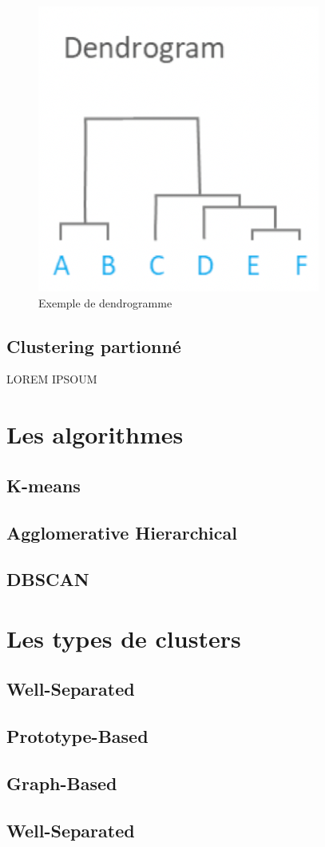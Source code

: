 \documentclass[memoire.tex]{subfiles}
\begin{document}
	\begin{figure}
		\includegraphics[scale=0.8]{img/hierarchical_clustering.png}
		\caption{Exemple de dendrogramme}
	\end{figure}
\newpage
\subsection{Clustering partionné}
LOREM IPSOUM
\section{Les algorithmes}
\subsection{K-means}
\subsection{Agglomerative Hierarchical }
\subsection{DBSCAN}
\section{Les types de clusters}
\subsection{Well-Separated}
\subsection{Prototype-Based}
\subsection{Graph-Based}
\subsection{Well-Separated}
\end{document}
